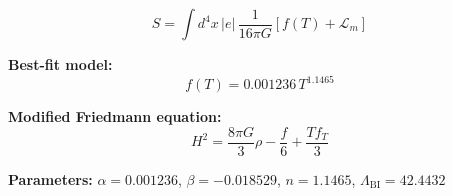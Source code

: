 
\begin{equation}
  S = \int d^4x \, |e| \, \frac{1}{16\pi G} \left[ f(T) + \mathcal{L}_m \right]
\end{equation}

\textbf{Best-fit model:}
\begin{equation}
  f(T) = 0.001236 \, T^{1.1465}
\end{equation}

\textbf{Modified Friedmann equation:}
\begin{equation}
  H^2 = \frac{8\pi G}{3} \rho - \frac{f}{6} + \frac{T f_T}{3}
\end{equation}

\textbf{Parameters:}
$\alpha = 0.001236$, \quad
$\beta = -0.018529$, \quad
$n = 1.1465$, \quad
$\Lambda_{\text{BI}} = 42.4432$